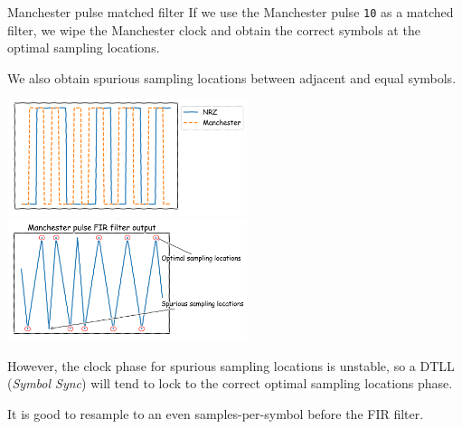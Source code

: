 \documentclass[aspectratio=169]{beamer}
\begin{document}
\begin{frame}{Manchester pulse matched filter}
  If we use the Manchester pulse \texttt{10} as a matched filter, we wipe the
  Manchester clock and obtain the correct symbols at the optimal sampling
  locations.

  We also obtain spurious sampling locations between adjacent and equal symbols.
  \begin{center}
      \includegraphics[width=7cm]{manchester_wave}
      \includegraphics[width=7cm]{manchester_fir}
  \end{center}

  However, the clock phase for spurious sampling locations is unstable, so a
  DTLL (\emph{Symbol Sync}) will tend to lock to the correct optimal sampling
  locations phase.

  It is good to resample to an even samples-per-symbol before the FIR filter.
\end{frame}



\end{document}
